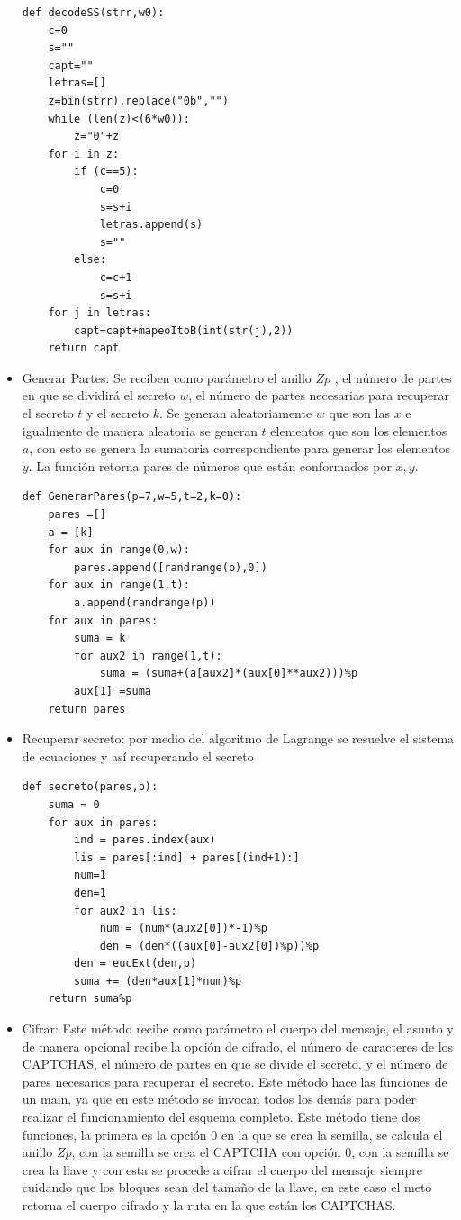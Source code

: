 \documentclass[12pt,oneside,onecolumn,openany]{report}
\begin{document}
\begin{itemize}
\begin{lstlisting}[frame=single]
 def decodeSS(strr,w0):
	c=0
	s=""
	capt=""
	letras=[]
	z=bin(strr).replace("0b","")
	while (len(z)<(6*w0)):
		z="0"+z
	for i in z:
		if (c==5):
			c=0
			s=s+i
			letras.append(s)
			s=""
		else:
			c=c+1
			s=s+i
	for j in letras:
		capt=capt+mapeoItoB(int(str(j),2))
	return capt
\end{lstlisting}
\item Generar Partes: Se reciben como parámetro el anillo $Zp$ , el número de partes en que se dividirá el secreto $w$, el número de partes necesarias para recuperar el secreto $t$ y el secreto $k$. Se generan aleatoriamente $w$ que son las $x$ e igualmente de manera aleatoria se generan $t$ elementos que son los elementos $a$, con esto se genera la sumatoria correspondiente para generar los elementos $y$. La función retorna pares de números que están conformados por $x,y$.
\begin{lstlisting}[frame=single]
 def GenerarPares(p=7,w=5,t=2,k=0):
    pares =[]
    a = [k]
    for aux in range(0,w):
        pares.append([randrange(p),0])
    for aux in range(1,t):
        a.append(randrange(p))
    for aux in pares:
        suma = k
        for aux2 in range(1,t):
            suma = (suma+(a[aux2]*(aux[0]**aux2)))%p
        aux[1] =suma
    return pares
\end{lstlisting}
\item Recuperar secreto: por medio del algoritmo de Lagrange se resuelve el sistema de ecuaciones y así recuperando el secreto
\begin{lstlisting}[frame=single]
 def secreto(pares,p):
    suma = 0
    for aux in pares:
        ind = pares.index(aux)
        lis = pares[:ind] + pares[(ind+1):]
        num=1
        den=1
        for aux2 in lis:
            num = (num*(aux2[0])*-1)%p
            den = (den*((aux[0]-aux2[0])%p))%p
        den = eucExt(den,p)
        suma += (den*aux[1]*num)%p
    return suma%p
\end{lstlisting}
\item Cifrar: Este método recibe como parámetro el cuerpo del mensaje, el asunto y de manera opcional recibe la opción de cifrado, el número de caracteres de los CAPTCHAS, el número de partes en que se divide el secreto, y el número de pares necesarios para recuperar el secreto.
Este método hace las funciones de un main, ya que en este método se invocan todos los demás para poder realizar el funcionamiento del esquema completo. Este método tiene dos funciones, la primera es la opción 0 en la que se crea la semilla, se calcula el anillo $Zp$, con la semilla se crea el CAPTCHA con opción 0, con la semilla se crea la llave y con esta se procede a cifrar el cuerpo del mensaje siempre cuidando que los bloques sean del tamaño de la llave, en este caso el meto retorna el cuerpo cifrado y la ruta en la que están los CAPTCHAS.

\end{itemize}
\end{document}
